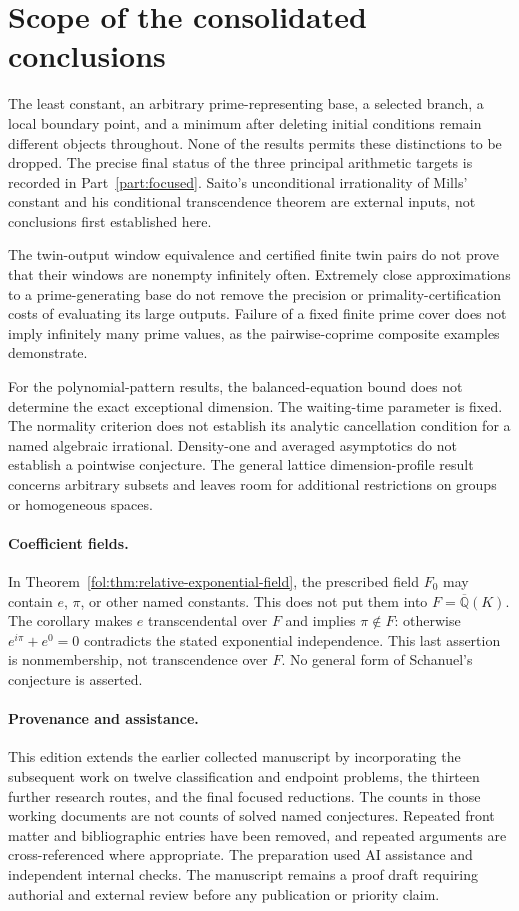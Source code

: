 \documentclass[11pt,a4paper]{article}
\theoremstyle{definition}
\theoremstyle{remark}
\numberwithin{equation}{section}
\begin{document}
\clearpage
\section{Scope of the consolidated conclusions}
The least constant, an arbitrary prime-representing base, a selected
branch, a local boundary point, and a minimum after deleting initial
conditions remain different objects throughout. None of the results
permits these distinctions to be dropped. The precise final status of
the three principal arithmetic targets is recorded in
Part~\ref{part:focused}. Saito's unconditional irrationality of Mills'
constant and his conditional transcendence theorem are external inputs,
not conclusions first established here.

The twin-output window equivalence and certified finite twin pairs do
not prove that their windows are nonempty infinitely often. Extremely
close approximations to a prime-generating base do not remove the
precision or primality-certification costs of evaluating its large outputs.
Failure of a fixed finite prime cover does not imply infinitely many
prime values, as the pairwise-coprime composite examples demonstrate.

For the polynomial-pattern results, the balanced-equation bound does
not determine the exact exceptional dimension. The waiting-time
parameter is fixed. The normality criterion does not establish its
analytic cancellation condition for a named algebraic irrational.
Density-one and averaged asymptotics do not establish a pointwise
conjecture. The general lattice dimension-profile result concerns
arbitrary subsets and leaves room for additional restrictions on groups
or homogeneous spaces.

\paragraph{Coefficient fields.}
In Theorem~\ref{fol:thm:relative-exponential-field}, the prescribed
field $F_0$ may contain $e$, $\pi$, or other named constants. This does
not put them into $F=\overline{\mathbb Q}(K)$. The corollary makes $e$
transcendental over $F$ and implies $\pi\notin F$: otherwise
$e^{i\pi}+e^0=0$ contradicts the stated exponential independence.
This last assertion is nonmembership, not transcendence over $F$.
No general form of Schanuel's conjecture is asserted.

\paragraph{Provenance and assistance.}
This edition extends the earlier collected manuscript by incorporating
the subsequent work on twelve classification and endpoint problems,
the thirteen further research routes, and the final focused reductions.
The counts in those working documents are not counts of solved named
conjectures. Repeated front matter and bibliographic entries have been
removed, and repeated arguments are cross-referenced where appropriate.
The preparation used AI assistance and independent internal checks.
The manuscript remains a proof draft requiring authorial and external
review before any publication or priority claim.
\end{document}
